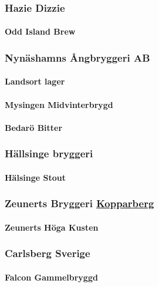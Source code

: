 \documentclass[11pt]{article}
\begin{document}
\subsubsection{Hazie Dizzie}
\label{sec:org1362fdf}
\paragraph{Odd Island Brew}
\label{sec:org198c082}
\subsubsection{Nynäshamns Ångbryggeri AB}
\label{sec:org8bdd7f4}
\paragraph{Landsort lager}
\label{sec:org1f64722}
\paragraph{Mysingen Midvinterbrygd}
\label{sec:org3e86a79}
\paragraph{Bedarö Bitter}
\label{sec:orgc512b59}
\subsubsection{Hällsinge bryggeri}
\label{sec:orgb1fd3a8}
\paragraph{Hälsinge Stout}
\label{sec:org1445bf5}
\subsubsection{Zeunerts Bryggeri \underline{Kopparberg}}
\label{sec:org3b88397}
\paragraph{Zeunerts Höga Kusten}
\label{sec:orgc3f958c}
\subsubsection{Carlsberg Sverige}
\label{sec:orgf100b56}
\paragraph{Falcon Gammelbryggd}
\label{sec:org40fa00a}
\end{document}

